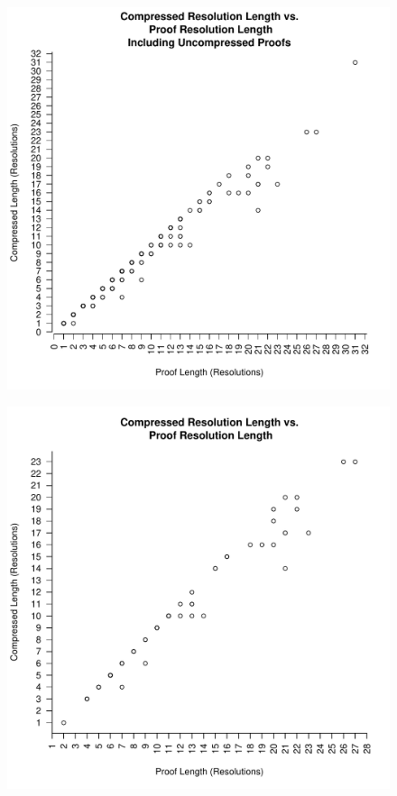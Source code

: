 \begin{figure}
\includegraphics[scale=0.5]{images/res_length_vs_compress_res_length_all_proofs.pdf}
\end{figure}
\begin{figure}
\includegraphics[scale=0.5]{images/res_length_vs_compress_res_length.pdf}
\end{figure}